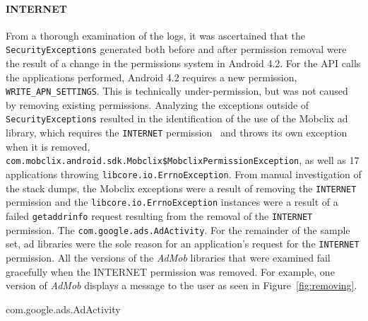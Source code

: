 \paragraph{\bfseries \ttfamily INTERNET}
From a thorough examination of the logs, it was ascertained that the \texttt{SecurityExceptions} generated both before and after permission removal were the result of a change in the permissions system in Android 4.2.  For the API calls the applications performed, Android 4.2 requires a new permission, \texttt{WRITE\_APN\_SETTINGS}.  This is technically under-permission, but was not caused by removing existing permissions.  Analyzing the exceptions outside of \texttt{SecurityExceptions} resulted in the identification of the use of the Mobclix ad library, which requires the \texttt{INTERNET} permission~\cite{mobclix} and throws its own exception when it is removed, \texttt{com.mobclix.android.sdk.Mobclix\$MobclixPermissionException}, as well as 17 applications throwing \texttt{libcore.io.ErrnoException}.  From manual investigation of the stack dumps, the Mobclix exceptions were a result of removing the \texttt{INTERNET} permission and the \texttt{libcore.io.ErrnoException} instances were a result of a failed \texttt{getaddrinfo} request resulting from the removal of the \texttt{INTERNET} permission.  The \texttt{com.google.ads.AdActivity}.  For the remainder of the sample set, ad libraries were the sole reason for an application's request for the \texttt{INTERNET} permission.  All the versions of the \textit{AdMob} libraries that were examined fail gracefully when the INTERNET permission was removed.  For example,  one version of \textit{AdMob} displays a message to the user as seen in Figure~\ref{fig:removing}.    

com.google.ads.AdActivity   

